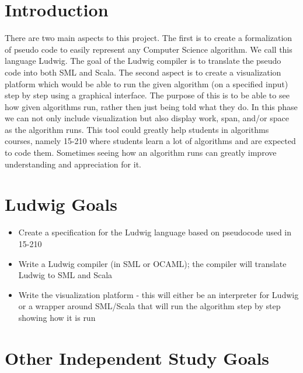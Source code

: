 \documentclass[11pt]{article}
\begin{document}
\maketitle

\section*{Introduction}
There are two main aspects to this project. The first is to create a formalization of pseudo code to easily represent any Computer Science algorithm. We call this language Ludwig. The goal of the Ludwig compiler is to translate the pseudo code into both SML and Scala. The second aspect is to create a visualization platform which would be able to run the given algorithm (on a specified input) step by step using a graphical interface. The purpose of this is to be able to see how given algorithms run, rather then just being told what they do. In this phase we can not only include visualization but also display work, span, and/or space as the algorithm runs. This tool could greatly help students in algorithms courses, namely 15-210 where students learn a lot of algorithms and are expected to code them. Sometimes seeing how an algorithm runs can greatly improve understanding and appreciation for it. 

\clearpage

\section*{Ludwig Goals}

\begin{itemize}

\item Create a specification for the Ludwig language based on pseudocode used in 15-210

\item Write a Ludwig compiler (in SML or OCAML); the compiler will translate Ludwig to SML and Scala

\item Write the visualization platform - this will either be an interpreter for Ludwig or a wrapper around SML/Scala that will run the algorithm step by step showing how it is run 

\end{itemize}

\section*{Other Independent Study Goals}
\end{document}

